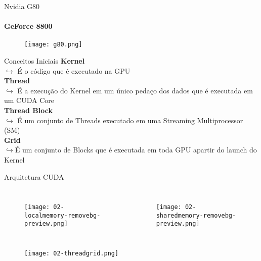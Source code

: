 \begin{frame}[t]{Nvidia G80}
    \framesubtitle{GeForce 8800}
    \begin{figure}
        \texttt{[image: g80.png]}
    \end{figure}

\end{frame}
\begin{frame}[t]{Conceitos Iniciais}
    \LARGE{
    \textbf{Kernel}\\
    }
    \large{
    $\hookrightarrow$ É o código que é executado na GPU\\
    }
    \LARGE{
    \textbf{Thread}\\
    }
    \large{
    $\hookrightarrow$ É a execução do Kernel em um único pedaço dos dados que é executada em um CUDA Core\\
    }
    \LARGE{
    \textbf{Thread Block}\\
    }
    \large{
    $\hookrightarrow$ É um conjunto de Threads executado em uma Streaming Multiprocessor (SM)\\
    }
    \LARGE{
    \textbf{Grid}\\
    }
    \large{
    $\hookrightarrow$É um conjunto de Blocks que é executada em toda GPU apartir do launch do Kernel
    }
\end{frame}
\begin{frame}[t]{Arquitetura CUDA}
    \begin{columns}
            \begin{figure}
               \texttt{[image: 02-localmemory-removebg-preview.png]}
            \end{figure}
            \begin{figure}
               \texttt{[image: 02-sharedmemory-removebg-preview.png]}
            \end{figure}
    \end{columns}
    \begin{figure}
        \texttt{[image: 02-threadgrid.png]}
    \end{figure}
\end{frame}
